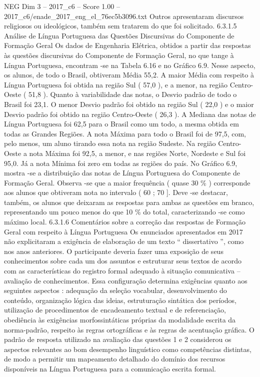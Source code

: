 \begin{textsample}{NEG Dim 3 – 2017\_c6 – Score 1.00 – 2017\_c6/enade\_2017\_eng\_el\_76ec5b3096.txt}
Outros apresentaram discursos religiosos ou ideológicos, também sem tratarem do que foi solicitado. 6.3.1.5 Análise de Língua Portuguesa das Questões Discursivas do Componente de Formação Geral Os dados de Engenharia Elétrica, obtidos a partir das respostas às questões discursivas do Componente de Formação Geral, no que tange à Língua Portuguesa, encontram -se na Tabela 6.16 e no Gráfico 6.9.
Nesse aspecto, os alunos, de todo o Brasil, obtiveram Média 55,2.
A maior Média com respeito à Língua Portuguesa foi obtida na região Sul ( 57,0 ), e a menor, na região Centro-Oeste ( 51,8 ).
Quanto à variabilidade das notas, o Desvio padrão de todo o Brasil foi 23,1.
O menor Desvio padrão foi obtido na região Sul ( 22,0 ) e o maior Desvio padrão foi obtido na região Centro-Oeste ( 26,3 ).
A Mediana das notas de Língua Portuguesa foi 62,5 para o Brasil como um todo, a mesma obtida em todas as Grandes Regiões.
A nota Máxima para todo o Brasil foi de 97,5, com, pelo menos, um aluno tirando essa nota na região Sudeste.
Na região Centro-Oeste a nota Máxima foi 92,5, a menor, e nas regiões Norte, Nordeste e Sul foi 95,0.
Já a nota Mínima foi zero em todas as regiões do país.
No Gráfico 6.9, mostra -se a distribuição das notas de Língua Portuguesa do Componente de Formação Geral.
Observa -se que a maior frequência ( quase 30 \% ) corresponde aos alunos que obtiveram nota no intervalo ( 60 ; 70 ].
Deve -se destacar, também, os alunos que deixaram as respostas para ambas as questões em branco, representando um pouco menos do que 10 \% do total, caracterizando -se como máximo local. 6.3.1.6 Comentários sobre a correção das respostas de Formação Geral com respeito à Língua Portuguesa Os enunciados apresentados em 2017 não explicitaram a exigência de elaboração de um texto “ dissertativo ”, como nos anos anteriores.
O participante deveria fazer uma exposição de seus conhecimentos sobre cada um dos assuntos e estruturar seus textos de acordo com as características do registro formal adequado à situação comunicativa – avaliação de conhecimentos.
Essa configuração determina exigências quanto aos seguintes aspectos : adequação da seleção vocabular, desenvolvimento do conteúdo, organização lógica das ideias, estruturação sintática dos períodos, utilização de procedimentos de encadeamento textual e de referenciação, obediência às exigências morfossintáticas próprias da modalidade escrita da norma-padrão, respeito às regras ortográficas e às regras de acentuação gráfica.
O padrão de resposta utilizado na avaliação das questões 1 e 2 considerou os aspectos relevantes ao bom desempenho linguístico como competências distintas, de modo a permitir um mapeamento detalhado do domínio dos recursos disponíveis na Língua Portuguesa para a comunicação escrita formal.

\end{textsample}
